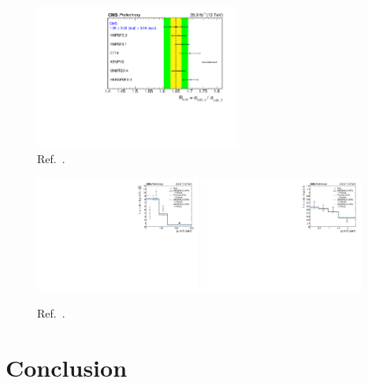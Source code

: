 \documentclass{PoS}
\begin{document}
\begin{figure}[!htb]
\begin{center}
\includegraphics[width=0.6\textwidth]{tch3.pdf}
\caption{\label{fig:t-channel-ratio}Ref.~\cite{tch}.}
\end{center}
\end{figure}

\begin{figure}[!htb]
\begin{center}
\includegraphics[width=0.48\textwidth]{unfolded_top_pt.pdf}\hspace{0.02\textwidth}
\includegraphics[width=0.48\textwidth]{unfolded_top_y.pdf}
\caption{\label{fig:t-channel-diff}Ref.~\cite{tchdiff}.}
\end{center}
\end{figure}

\section{Conclusion}

\clearpage
\end{document}
